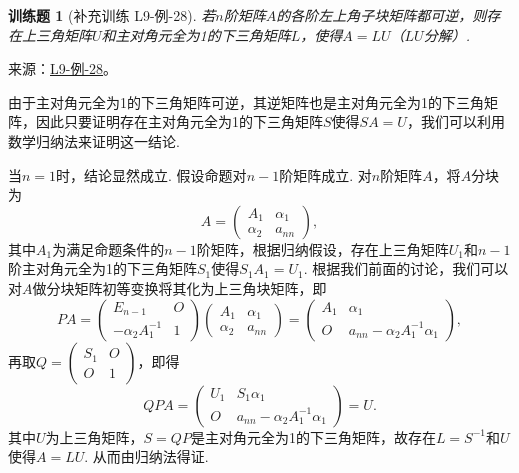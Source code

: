 \documentclass[UTF8,12pt,a4paper,fontset=fandol]{ctexart}
\newtheorem{exercise}{训练题}[section]
\begin{document}
\begin{exercise}[补充训练 L9-例-28]\label{prob:L9-例-28}
若$n$阶矩阵$A$的各阶左上角子块矩阵都可逆，则存在上三角矩阵$U$和主对角元全为1的下三角矩阵$L$，使得$A=LU$（$LU$分解）.
\end{exercise}
\noindent 来源：\href{https://github.com/yhwu-is/Linear-Algebra-Left-Undone/blob/new/%E8%AE%B2%E4%B9%89/%E4%B8%93%E9%A2%98/9%20%E7%9F%A9%E9%98%B5%E8%BF%90%E7%AE%97%E8%BF%9B%E9%98%B6.tex}{L9-例-28}。
\begin{solve}
由于主对角元全为1的下三角矩阵可逆，其逆矩阵也是主对角元全为1的下三角矩阵，因此只要证明存在主对角元全为1的下三角矩阵$S$使得$SA=U$，我们可以利用数学归纳法来证明这一结论.

    当$n=1$时，结论显然成立. 假设命题对$n-1$阶矩阵成立. 对$n$阶矩阵$A$，将$A$分块为
    \[A=\begin{pmatrix}
            A_1 & \alpha_1 \\ \alpha_2 & a_{nn}
        \end{pmatrix},\]
    其中$A_1$为满足命题条件的$n-1$阶矩阵，根据归纳假设，存在上三角矩阵$U_1$和$n-1$阶主对角元全为1的下三角矩阵$S_1$使得$S_1A_1=U_1$. 根据我们前面的讨论，我们可以对$A$做分块矩阵初等变换将其化为上三角块矩阵，即
    \[PA=\begin{pmatrix}
            E_{n-1} & O \\ -\alpha_2A_1^{-1} & 1
        \end{pmatrix}\begin{pmatrix}
            A_1 & \alpha_1 \\ \alpha_2 & a_{nn}
        \end{pmatrix}=\begin{pmatrix}
            A_1 & \alpha_1 \\ O & a_{nn}-\alpha_2A_1^{-1}\alpha_1
        \end{pmatrix},\]
    再取$Q=\begin{pmatrix}
            S_1 & O \\ O & 1
        \end{pmatrix}$，即得
    \[QPA=\begin{pmatrix}
            U_1 & S_1\alpha_1 \\ O & a_{nn}-\alpha_2A_1^{-1}\alpha_1
        \end{pmatrix}=U.\]
    其中$U$为上三角矩阵，$S=QP$是主对角元全为1的下三角矩阵，故存在$L=S^{-1}$和$U$使得$A=LU$. 从而由归纳法得证.
\end{solve}
\end{document}
